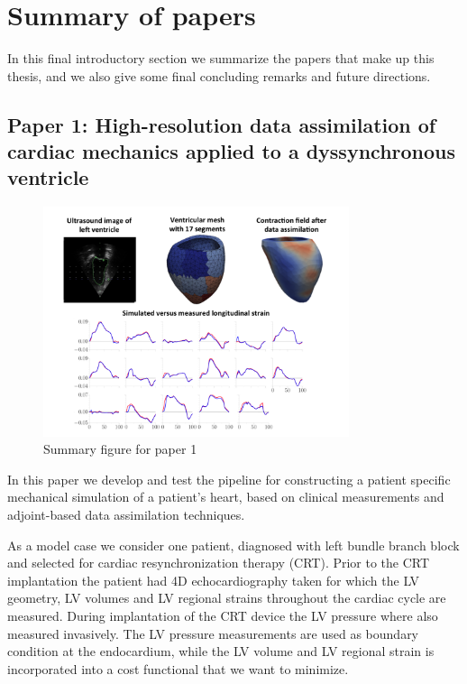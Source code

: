
\section{Summary of papers}
\label{sec:summary}
In this final introductory section we summarize the papers that make
up this thesis, and we also give some final concluding remarks
and future directions. 

\subsection{Paper 1: High-resolution data assimilation of cardiac mechanics
  applied to a dyssynchronous ventricle}



\begin{figure}[htbp]
  \centering
    \includegraphics[width=0.8\textwidth]{chapters/introduction/figures/paper1}
\caption{Summary figure for paper 1}
\label{fig:paper1}
\end{figure}


In this paper we develop and test the pipeline for constructing a
patient specific mechanical simulation of a patient's heart, based on
clinical measurements and adjoint-based data assimilation
techniques.

As a model case we consider one patient, diagnosed with
left bundle branch block and selected for cardiac resynchronization
therapy (CRT). Prior to the CRT implantation the patient had 4D
echocardiography taken for which the LV geometry, LV volumes and LV
regional strains throughout the cardiac cycle are measured. During
implantation of the CRT device the LV pressure where also measured
invasively. The LV pressure measurements are used as boundary condition at the
endocardium, while the LV volume and LV regional strain is incorporated
into a cost functional that we want to minimize.


